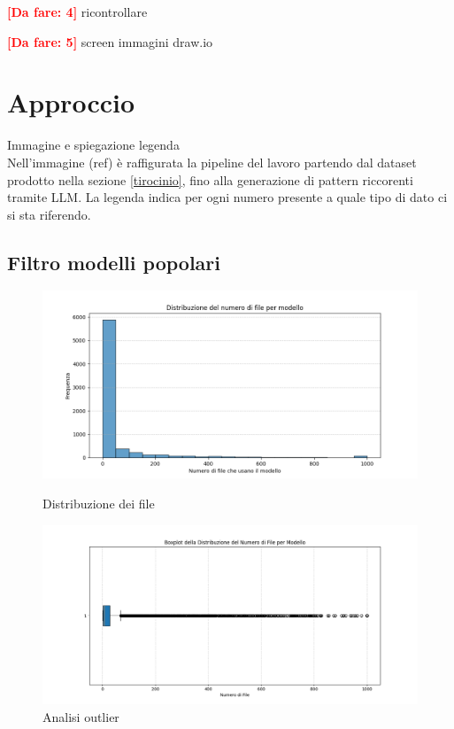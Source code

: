 \documentclass{article}
\newcommand{\dafare}[1]{\textbf{\textcolor{red}{[Da fare: #1]}}}
\begin{document}
\dafare{4}
ricontrollare

\dafare{5}
screen immagini draw.io

\section{Approccio}
Immagine e spiegazione legenda\\
Nell'immagine (ref) è raffigurata la pipeline del lavoro partendo dal dataset prodotto nella sezione \ref{tirocinio}, fino alla generazione di pattern riccorenti tramite LLM. La legenda indica per ogni numero presente a quale tipo di dato ci si sta riferendo.\\
\subsection{Filtro modelli popolari}
\begin{figure}[h]
    \centering
    \begin{minipage}{0.45\textwidth}
        \centering
        \includegraphics[width=\linewidth]{img/approccio1.png}
        \caption{Distribuzione dei file}
        \label{fig:distribuzione_file1}
    \end{minipage}
    \hfill
    \begin{minipage}{0.45\textwidth}
        \centering
        \includegraphics[width=\linewidth]{img/approccio2.png}
        \caption{Analisi outlier}
        \label{fig:outlier_file1}
    \end{minipage}
\end{figure}
\end{document}
